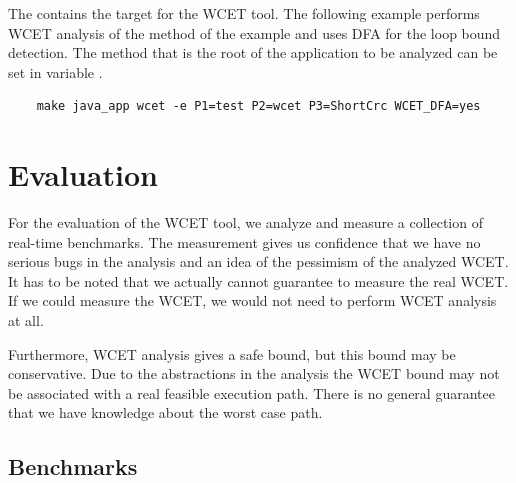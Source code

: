 The  contains the target  for the WCET
tool. The following example performs WCET analysis of the method
 of the  example and uses DFA for the loop
bound detection. The method that is the root of the application to be
analyzed can be set in variable .
\begin{lstlisting}
    make java_app wcet -e P1=test P2=wcet P3=ShortCrc WCET_DFA=yes
\end{lstlisting}

\section{Evaluation}
\label{sec:wcet:eval}

For the evaluation of the WCET tool, we analyze and measure a
collection of real-time benchmarks. The measurement gives us
confidence that we have no serious bugs in the analysis and an idea
of the pessimism of the analyzed WCET. It has to be noted that we
actually cannot guarantee to measure the real WCET. If we could
measure the WCET, we would not need to perform WCET analysis at all.

Furthermore, WCET analysis gives a safe bound, but this bound may be
conservative. Due to the abstractions in the analysis the WCET bound
may not be associated with a real feasible execution path. There is
no general guarantee that we have knowledge about the worst case
path.


\subsection{Benchmarks}
\label{sec:benchmarks}

